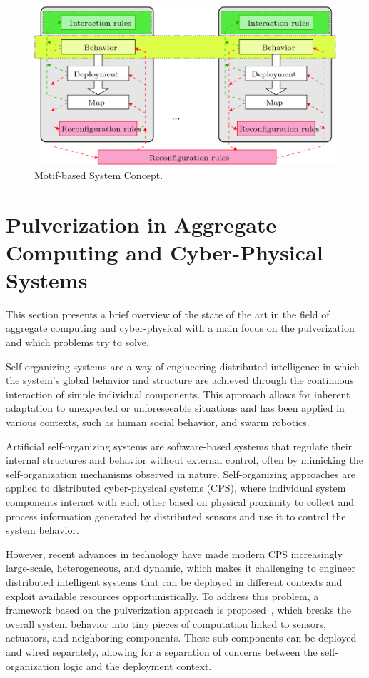\begin{figure}
	\centering
	\includegraphics[width=0.8\linewidth]{figures/motif-concept.png}
	\caption{Motif-based System Concept.}
	\label{fig:motif-concept}
\end{figure}


\section{Pulverization in Aggregate Computing and Cyber-Physical Systems}
\label{sec:pulverization-aggregate-computing-cps}

This section presents a brief overview of the state of the art in the field of aggregate computing and cyber-physical with a main focus on the
pulverization and which problems try to solve.

Self-organizing systems are a way of engineering distributed intelligence in which the system's global behavior and structure are achieved through the continuous interaction of simple individual components. This approach allows for inherent adaptation to unexpected or unforeseeable situations and has been applied in various contexts, such as human social behavior, and swarm robotics.

Artificial self-organizing systems are software-based systems that regulate their internal structures and behavior without external control, often by mimicking the self-organization mechanisms observed in nature. Self-organizing approaches are applied to distributed cyber-physical systems (CPS), where individual system components interact with each other based on physical proximity to collect and process information generated by distributed sensors and use it to control the system behavior.

However, recent advances in technology have made modern CPS increasingly large-scale, heterogeneous, and dynamic, which makes it challenging to engineer distributed intelligent systems that can be deployed in different contexts and exploit available resources opportunistically. To address this problem, a framework based on the pulverization approach is proposed~\cite{fi12110203}, which breaks the overall system behavior into tiny pieces of computation linked to sensors, actuators, and neighboring components. These sub-components can be deployed and wired separately, allowing for a separation of concerns between the self-organization logic and the deployment context.

